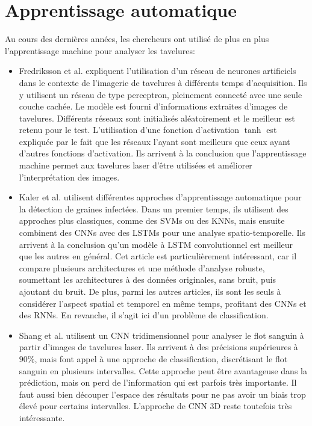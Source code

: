 \documentclass[MSc,french]{ulthese}
\begin{document}
\section{Apprentissage automatique}
Au cours des dernières années, les chercheurs ont utilisé de plus en plus l'apprentissage machine pour analyser les tavelures:
\begin{itemize}
\item Fredriksson et al. \cite{fredriksson_machine_2019, hultman_speed-resolved_2023} expliquent l'utilisation d'un réseau de neurones artificiels dans le contexte de l'imagerie de tavelures à différents temps d'acquisition. Ils y utilisent un réseau de type perceptron, pleinement connecté avec une seule couche cachée. Le modèle est fourni d'informations extraites d'images de tavelures. Différents réseaux sont initialisés aléatoirement et le meilleur est retenu pour le test. L'utilisation d'une fonction d'activation $\tanh$ est expliquée par le fait que les réseaux l'ayant sont meilleurs que ceux ayant d'autres fonctions d'activation. Ils arrivent à la conclusion que l'apprentissage machine permet aux tavelures laser d'être utilisées et améliorer l'interprétation des images.
\item Kaler et al. \cite{kaler_deep_2023} utilisent différentes approches d'apprentissage automatique pour la détection de graines infectées. Dans un premier temps, ils utilisent des approches plus classiques, comme des SVMs ou des KNNs, mais ensuite combinent des CNNs avec des LSTMs pour une analyse spatio-temporelle. Ils arrivent à la conclusion qu'un modèle à LSTM convolutionnel est meilleur que les autres en général. Cet article est particulièrement intéressant, car il compare plusieurs architectures et une méthode d'analyse robuste, soumettant les architectures à des données originales, sans bruit, puis ajoutant du bruit. De plus, parmi les autres articles, ils sont les seuls à considérer l'aspect spatial et temporel en même temps, profitant des CNNs et des RNNs. En revanche, il s'agit ici d'un problème de classification.
\item Shang et al. \cite{shang_estimation_2025} utilisent un CNN tridimensionnel pour analyser le flot sanguin à partir d'images de tavelures laser. Ils arrivent à des précisions supérieures à $90\%$, mais font appel à une approche de classification, discrétisant le flot sanguin en plusieurs intervalles. Cette approche peut être avantageuse dans la prédiction, mais on perd de l'information qui est parfois très importante. Il faut aussi bien découper l'espace des résultats pour ne pas avoir un biais trop élevé pour certains intervalles. L'approche de CNN 3D reste toutefois très intéressante.
\end{itemize}
\newpage
\end{document}
